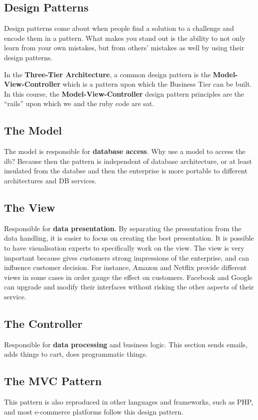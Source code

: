 \documentclass[11pt]{article}
\begin{document}
\subsection{Design Patterns}
Design patterns come about when people find a solution to a challenge and encode them in a pattern. What makes you stand out is the ability to not only learn from your own mistakes, but from others' mistakes as well by using their design patterns.

In the \textbf{Three-Tier Architecture}, a common design pattern is the \textbf{Model-View-Controller} which is a pattern upon which the Business Tier can be built. In this course, the \textbf{Model-View-Controller} design pattern principles are the ``rails'' upon which we and the ruby code are sat.

\subsection{The Model}
The model is responsible for \textbf{database access}. Why use a model to access the db? Because then the pattern is independent of database architecture, or at least insulated from the databse and then the enterprise is more portable to different architectures and DB services.

\subsection{The View}
Responsible for \textbf{data presentation}. By separating the presentation from the data handling, it is easier to focus on creating the best presentation. It is possible to have visualisation experts to specifically work on the view. The view is very important because gives customers strong impressions of the enterprise, and can influence customer decision. For instance, Amazon and Netflix provide different views in some cases in order gauge the effect on customers. Facebook and Google can upgrade and modify their interfaces without risking the other aspects of their service.

\subsection{The Controller}
Responsible for \textbf{data processing} and business logic. This section sends emails, adds things to cart, does programmatic things.

\subsection{The MVC Pattern}
This pattern is also reproduced in other languages and frameworks, such as PHP, and most e-commerce platforms follow this design pattern.
\end{document}
